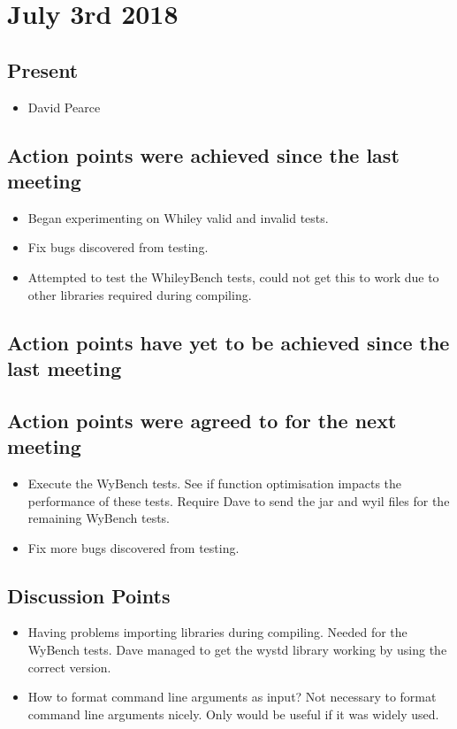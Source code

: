 \documentclass[]{article}
\begin{document}
\section{July 3rd 2018}
\subsection{Present}
\begin{itemize}
	\item David Pearce
\end{itemize}

\subsection{Action points were achieved since the last meeting}
\begin{itemize}
	\item Began experimenting on Whiley valid and invalid tests.
	\item Fix bugs discovered from testing.
	\item Attempted to test the WhileyBench tests, could not get this to work due to other libraries required during compiling. 
\end{itemize}
\subsection{Action points have yet to be achieved since the last meeting}

\subsection{Action points were agreed to for the next meeting}
\begin{itemize}
	\item Execute the WyBench tests. See if function optimisation impacts the performance of these tests.
	Require Dave to send the jar and wyil files for the remaining WyBench tests.
	\item Fix more bugs discovered from testing.
\end{itemize}
\subsection{Discussion Points}
\begin{itemize}
 \item Having problems importing libraries during compiling. Needed for the WyBench tests. 	Dave managed to get the wystd library working by using the correct version.
 \item How to format command line arguments as input? Not necessary to format command line arguments nicely. Only would be useful if it was widely used.
\end{itemize}
\end{document}

